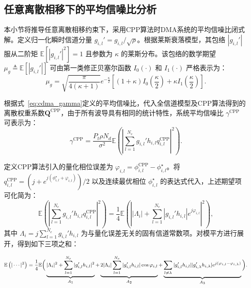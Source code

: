 \subsection{任意离散相移下的平均信噪比分析}

本小节将推导任意离散相移约束下，采用CPP算法时DMA系统的平均信噪比闭式解。定义归一化瞬时信道分量 $g_{i,l}' = g_{i,l} / \sqrt{\rho}$。根据莱斯衰落模型，其包络 $|g_{i,l}'|$ 服从二阶矩 $\mathbb{E}[|g_{i,l}'|^2] = 1$ 且参数为 $\kappa$ 的莱斯分布。该包络的数学期望 $\mu_g \triangleq \mathbb{E}[|g_{i,l}'|]$ 可由第一类修正贝塞尔函数 $I_0(\cdot)$ 和 $I_1(\cdot)$ 严格表示为：
\begin{equation}\label{eq:ddma_mug}
	\mu_g = \sqrt{\frac{\pi}{4(\kappa+1)}} e^{-\frac{\kappa}{2}} \left[ (1+\kappa) I_0\left(\frac{\kappa}{2}\right) + \kappa I_1\left(\frac{\kappa}{2}\right) \right].
\end{equation}

根据式~\eqref{eq:cdma_gamma}定义的平均信噪比，代入全信道模型及CPP算法得到的离散权重系数$\bm Q^{\text{CPP}}$，由于所有波导具有相同的统计特性，系统平均信噪比 $\gamma^{\text{CPP}}$ 可表示为：
\begin{equation}\label{eq:ddma_gamma}
	\gamma^{\text{CPP}} = \frac{P_t \rho N_d}{\sigma^2} \mathbb{E}\left(\left| \sum_{l=1}^{N_{e}} g_{i,l}' h_{i, l} q_{i,l}^{\text{CPP}}\right|^{2}\right).
\end{equation}

定义CPP算法引入的量化相位误差为 $\varphi_{i,l} = \phi_{i,l}^{\text{CPP}} - \phi_{i,l}^\star$。将 $q_{i,l}^{\text{CPP}} = (j+e^{j(\phi_{i,l}^\star + \varphi_{i,l})})/2$ 以及连续最优相位 $\phi_{i,l}^\star$ 的表达式代入，上述期望项可化简为：
\begin{equation}\label{eq:ddma_E_total}
	\mathbb{E}\left(\left| \sum_{l=1}^{N_{e}} g_{i,l}' h_{i, l} q_{i,l}^{\text{CPP}}\right|^{2}\right) = \frac{1}{4} \mathbb{E}\left( \left| |\Lambda_i| + \sum_{l=1}^{N_e} |g_{i,l}' h_{i,l}| e^{j\varphi_{i,l}} \right|^2 \right),
\end{equation}
其中 $\Lambda_i = j \sum_{l=1}^{N_{e}} g_{i,l}' h_{i,l}$ 为与量化误差无关的固有信道常数项。对模平方进行展开，得到如下三项之和：

\begin{equation}\label{eq:ddma_E_terms}
	\medmath{
		\mathbb{E}\left( | \cdots |^2 \right) = \frac{1}{4} \mathbb{E}
		\bigg( \underbrace{|\Lambda_i|^2 + \sum_{l=1}^{N_e} |g_{i,l}' h_{i,l}|^2}_{A_1} + \underbrace{2|\Lambda_i| \sum_{l=1}^{N_e} |g_{i,l}' h_{i,l}| \cos \varphi_{i,l}}_{A_2} + \underbrace{\sum_{l \ne \lambda} |g_{i,l}' h_{i,l}| |g_{i,\lambda}' h_{i,\lambda}| e^{j(\varphi_{i,l} - \varphi_{i,\lambda})}}_{A_3} \bigg).
	}
\end{equation}


